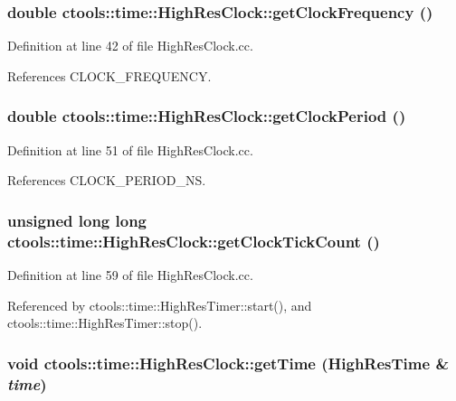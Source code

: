 \subsubsection{\setlength{\rightskip}{0pt plus 5cm}double ctools::time::High\-Res\-Clock::get\-Clock\-Frequency ()\hspace{0.3cm}{\tt  [static]}}\label{classctools_1_1time_1_1HighResClock_e3}




Definition at line 42 of file High\-Res\-Clock.cc.

References CLOCK\_\-FREQUENCY.
\subsubsection{\setlength{\rightskip}{0pt plus 5cm}double ctools::time::High\-Res\-Clock::get\-Clock\-Period ()\hspace{0.3cm}{\tt  [static]}}\label{classctools_1_1time_1_1HighResClock_e4}




Definition at line 51 of file High\-Res\-Clock.cc.

References CLOCK\_\-PERIOD\_\-NS.
\subsubsection{\setlength{\rightskip}{0pt plus 5cm}unsigned long long ctools::time::High\-Res\-Clock::get\-Clock\-Tick\-Count ()\hspace{0.3cm}{\tt  [static]}}\label{classctools_1_1time_1_1HighResClock_e2}




Definition at line 59 of file High\-Res\-Clock.cc.

Referenced by ctools::time::High\-Res\-Timer::start(), and ctools::time::High\-Res\-Timer::stop().
\subsubsection{\setlength{\rightskip}{0pt plus 5cm}void ctools::time::High\-Res\-Clock::get\-Time ({\bf High\-Res\-Time} \& {\em time})\hspace{0.3cm}{\tt  [static]}}\label{classctools_1_1time_1_1HighResClock_e1}




